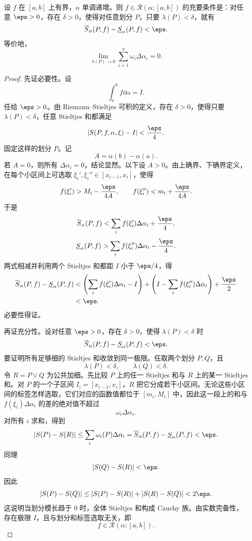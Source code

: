 \begin{theorem}\label{thm:stieltjes-darboux-criterion}
	设 $f$ 在 $[a,b]$ 上有界，$\alpha$ 单调递增。则 $f\in\mathcal R(\alpha;[a,b])$ 的充要条件是：对任意 $\eps>0$，存在 $\delta>0$，使得对任意划分 $P$，只要 $\lambda(P)<\delta$，就有
	\[
	\overline S_\alpha(P,f)-\underline S_\alpha(P,f)<\eps.
	\]
	等价地，
	\[
	\lim_{\lambda(P)\to0}\sum_{i=1}^n\omega_i\Delta\alpha_i=0.
	\]
\end{theorem}

\begin{proof}
	先证必要性。设
	\[
	\int_a^b f\dd\alpha=I.
	\]
	任给 $\eps>0$。由 Riemann--Stieltjes 可积的定义，存在 $\delta>0$，使得只要 $\lambda(P)<\delta$，任意 Stieltjes 和都满足
	\[
	\left|S(P,f,\alpha,\xi)-I\right|<\frac\eps4.
	\]
	固定这样的划分 $P$。记
	\[
	A=\alpha(b)-\alpha(a).
	\]
	若 $A=0$，则所有 $\Delta\alpha_i=0$，结论显然。以下设 $A>0$。由上确界、下确界定义，在每个小区间上可选取 $\xi_i',\xi_i''\in[x_{i-1},x_i]$，使得
	\[
	f(\xi_i')>M_i-\frac{\eps}{4A},
	\qquad
	f(\xi_i'')<m_i+\frac{\eps}{4A}.
	\]
	于是
	\[
	\overline S_\alpha(P,f)
	<\sum_i f(\xi_i')\Delta\alpha_i+\frac\eps4,
	\]
	\[
	\underline S_\alpha(P,f)
	>\sum_i f(\xi_i'')\Delta\alpha_i-\frac\eps4.
	\]
	两式相减并利用两个 Stieltjes 和都距 $I$ 小于 $\eps/4$，得
	\[
	\begin{aligned}
		\overline S_\alpha(P,f)-\underline S_\alpha(P,f)
		&<\left(\sum_i f(\xi_i')\Delta\alpha_i-I\right)
		+\left(I-\sum_i f(\xi_i'')\Delta\alpha_i\right)+\frac\eps2 \\
		&<\eps.
	\end{aligned}
	\]
	必要性得证。
	
	再证充分性。设对任意 $\eps>0$，存在 $\delta>0$，使得 $\lambda(P)<\delta$ 时
	\[
	\overline S_\alpha(P,f)-\underline S_\alpha(P,f)<\eps.
	\]
	要证明所有足够细的 Stieltjes 和收敛到同一极限。任取两个划分 $P,Q$，且
	\[
	\lambda(P)<\delta,
	\qquad
	\lambda(Q)<\delta.
	\]
	令 $R=P\vee Q$ 为公共加细。先比较 $P$ 上的任一 Stieltjes 和与 $R$ 上的某一 Stieltjes 和。对 $P$ 的一个子区间 $I_i=[x_{i-1},x_i]$，$R$ 把它分成若干小区间。无论这些小区间的标签怎样选取，它们对应的函数值都位于 $[m_i,M_i]$ 中，因此这一段上的和与 $f(\xi_i)\Delta\alpha_i$ 的差的绝对值不超过
	\[
	\omega_i\Delta\alpha_i.
	\]
	对所有 $i$ 求和，得到
	\[
	|S(P)-S(R)|\leq\sum_i\omega_i(P)\Delta\alpha_i
	=\overline S_\alpha(P,f)-\underline S_\alpha(P,f)<\eps.
	\]
	同理
	\[
	|S(Q)-S(R)|<\eps.
	\]
	因此
	\[
	|S(P)-S(Q)|\leq |S(P)-S(R)|+|S(R)-S(Q)|<2\eps.
	\]
	这说明当划分模长趋于 $0$ 时，全体 Stieltjes 和构成 Cauchy 族。由实数完备性，存在极限 $I$，且与划分和标签选取无关，即
	\[
	f\in\mathcal R(\alpha;[a,b]).
	\]
\end{proof}

